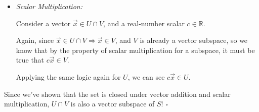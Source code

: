 \begin{enumerate}
{\begin{itemize}
{	    It may help to consider this graphically:
	    \begin{center}
	    	
	    \end{center}
	    We've marked in green the intersection between sets $U$ and $V$.

	    If $\vec{x}, \vec{y}\in U\cap V$, both fall in the center region of the venn diagram. This means $\vec{x}, \vec{y} \in U$ as well as $V$! The implication goes both ways; if some vector $\vec{z}$ falls in both $U$ and $V$ (the left and right circles), then it necessarily falls into their intersection, $U\cap V$.

	    We're already told that $V$ and $U$ are vector spaces, meaning $\vec{x} + \vec{y} \in U$ and $V$ separately, so $\vec{x} + \vec{y} \in U\cap V$.


	    }
	    \item{\textit{Scalar Multiplication:} 

	    Consider a vector $\vec{x} \in U \cap V$, and a real-number scalar $c \in \mathbb{R}$.

	    Again, since $\vec{x} \in U \cap V \Longrightarrow \vec{x} \in V$, and $V$ is already a vector subspace, so we know that by the property of scalar multiplication for a subspace, it must be true that $c\vec{x} \in V$.

	    Applying the same logic again for $U$, we can see $c\vec{x} \in U$.
	    }
	\end{itemize}
	Since we've shown that the set is closed under vector addition and scalar multiplication, $U \cap V$ is also a vector subspace of $S$!  $\square$
}

\end{enumerate}
